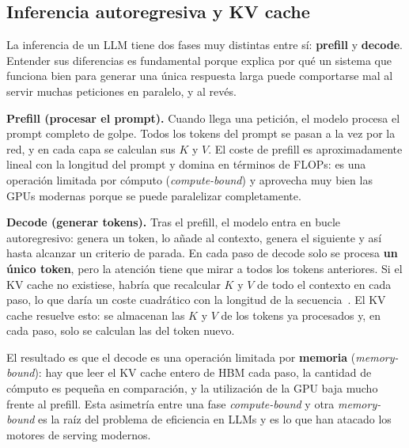 \documentclass[11pt,a4paper]{article}
\begin{document}
\subsection{Inferencia autoregresiva y KV cache}

La inferencia de un LLM tiene dos fases muy distintas entre sí: \textbf{prefill} y \textbf{decode}. Entender sus diferencias es fundamental porque explica por qué un sistema que funciona bien para generar una única respuesta larga puede comportarse mal al servir muchas peticiones en paralelo, y al revés.

\textbf{Prefill (procesar el prompt).} Cuando llega una petición, el modelo procesa el prompt completo de golpe. Todos los tokens del prompt se pasan a la vez por la red, y en cada capa se calculan sus $K$ y $V$. El coste de prefill es aproximadamente lineal con la longitud del prompt y domina en términos de FLOPs: es una operación limitada por cómputo (\textit{compute-bound}) y aprovecha muy bien las GPUs modernas porque se puede paralelizar completamente.

\textbf{Decode (generar tokens).} Tras el prefill, el modelo entra en bucle autoregresivo: genera un token, lo añade al contexto, genera el siguiente y así hasta alcanzar un criterio de parada. En cada paso de decode solo se procesa \textbf{un único token}, pero la atención tiene que mirar a todos los tokens anteriores. Si el KV cache no existiese, habría que recalcular $K$ y $V$ de todo el contexto en cada paso, lo que daría un coste cuadrático con la longitud de la secuencia~\cite{vaswani2017attention}. El KV cache resuelve esto: se almacenan las $K$ y $V$ de los tokens ya procesados y, en cada paso, solo se calculan las del token nuevo.

El resultado es que el decode es una operación limitada por \textbf{memoria} (\textit{memory-bound}): hay que leer el KV cache entero de HBM cada paso, la cantidad de cómputo es pequeña en comparación, y la utilización de la GPU baja mucho frente al prefill. Esta asimetría entre una fase \textit{compute-bound} y otra \textit{memory-bound} es la raíz del problema de eficiencia en LLMs y es lo que han atacado los motores de serving modernos.
\end{document}
